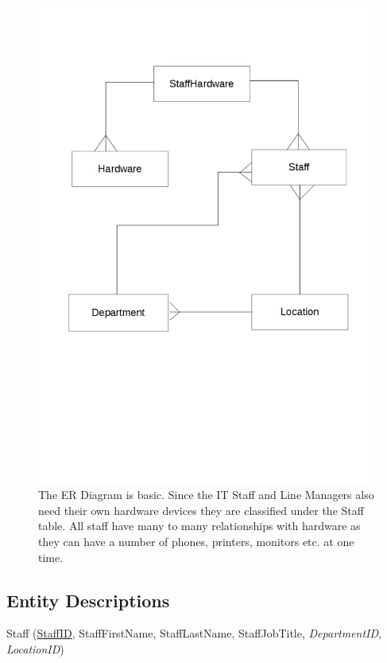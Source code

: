\begin{figure}[H]
\hspace*{-2cm}
\vspace*{5cm}
\setlength{\abovecaptionskip}{-320pt plus 3pt minus 2pt}
\includegraphics[width=1.2\textwidth]{ERDiagram.jpg}
\caption{The ER Diagram is basic. Since the IT Staff and Line Managers also need their own hardware devices they are classified under the Staff table. All staff have many to many relationships with hardware as they can have a number of phones, printers, monitors etc. at one time.} \label{ER Diagram}
\end{figure}

\subsection{Entity Descriptions}

\begin{center}
Staff  (\underline{StaffID}, StaffFirstName, StaffLastName, StaffJobTitle, \textit{DepartmentID},\\ \textit{ LocationID})
\end{center}

